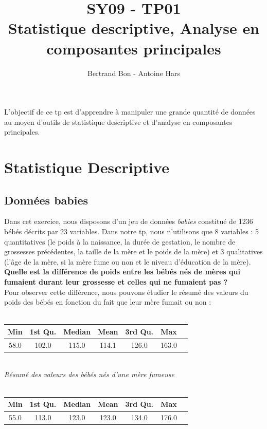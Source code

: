 \documentclass[a4paper, 10pt]{article}
\title{SY09 - TP01\\Statistique descriptive, Analyse en composantes principales}
\author{Bertrand Bon - Antoine Hars}
\begin{document}
\maketitle

L'objectif de ce tp est d'apprendre \`a manipuler une grande quantit\'e de données au moyen d'outils
de statistique descriptive et d'analyse en composantes principales.

\section{Statistique Descriptive}
\subsection{Donn\'ees babies}

Dans cet exercice, nous disposons d'un jeu de donn\'ees \textit{babies} constitu\'e de 1236 b\'eb\'es
d\'ecrits par 23 variables. Dans notre tp, nous n'utilisons que 8 variables : 5 quantitatives
(le poids \`a la naissance, la dur\'ee de gestation, le nombre de grossesses pr\'ec\'edentes,
la taille de la m\`ere et le poids de la m\`ere) et 3 qualitatives (l'\^age de la m\`ere,
si la m\`ere fume ou non et le niveau d'\'education de la m\`ere).\\
\newline\textbf{Quelle est la différence de poids entre les bébés nés de mères qui fumaient durant leur grossesse et celles
qui ne fumaient pas ?}\\
Pour observer cette différence, nous pouvons étudier le résumé des valeurs du poids des b\'eb\'es en fonction du fait
que leur m\`ere fumait ou non :\\ \\
\begin{tabular}{|c|c|c|c|c|c|c|}
\hline
Min & 1st Qu. & Median & Mean & 3rd Qu. & Max \\
\hline
58.0 & 102.0 & 115.0 & 114.1 & 126.0 & 163.0 \\
\hline
\end{tabular}\\
\textit{R\'esum\'e des valeurs des b\'eb\'es n\'es d'une m\`ere fumeuse}\\ \\
\begin{tabular}{|c|c|c|c|c|c|c|}
\hline
Min & 1st Qu. & Median & Mean & 3rd Qu. & Max \\
\hline
55.0 & 113.0 & 123.0 & 123.0 & 134.0 & 176.0 \\
\hline
\end{tabular}\\
\end{document}
